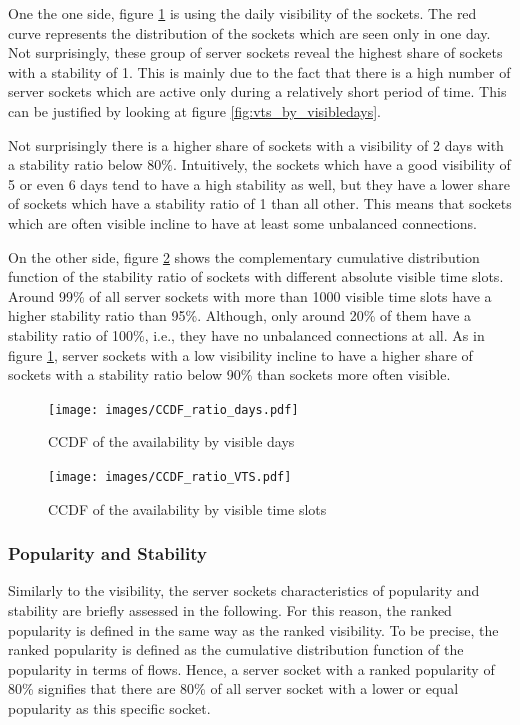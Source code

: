 One the one side, figure \ref{fig:ccdf_ratio_days} is using the daily visibility of the sockets. 
The red curve represents the distribution of the sockets which are seen only in one day. 
Not surprisingly, these group of \glspl{server socket} reveal the highest share of sockets with a stability of 1. 
This is mainly due to the fact that there is a high number of \glspl{server socket} which are active only during a relatively short period of time. This can be justified by looking at figure \ref{fig:vts_by_visibledays}.

Not surprisingly there is a higher share of sockets with a visibility of 2 days with a stability ratio below 80\%. 
Intuitively, the sockets which have a good visibility of 5 or even 6 days tend to have a high stability as well, but they have a lower share of sockets which have a stability ratio of 1 than all other. 
This means that sockets which are often visible incline to have at least some unbalanced connections.

On the other side, figure \ref{fig:ccdf_ratio_vts} shows the complementary cumulative distribution function of the stability ratio of sockets with different absolute visible time slots. 
Around 99\% of all \glspl{server socket} with more than 1000 visible time slots have a higher stability ratio than 95\%. 
Although, only around 20\% of them have a stability ratio of 100\%, i.e., they have no unbalanced connections at all. 
As in figure \ref{fig:ccdf_ratio_days}, \glspl{server socket} with a low visibility incline to have a higher share of sockets with a stability ratio below 90\% than sockets more often visible. 
\begin{landscape}
	\begin{figure}
		[p] \centering 
		\texttt{[image: images/CCDF\_ratio\_days.pdf]} \caption{CCDF of the availability by visible days} 
		\label{fig:ccdf_ratio_days} 
	\end{figure}
\end{landscape}
\begin{landscape}
	\begin{figure}
		[p] \centering 
		\texttt{[image: images/CCDF\_ratio\_VTS.pdf]} \caption{CCDF of the availability by visible time slots} 
		\label{fig:ccdf_ratio_vts} 
	\end{figure}
\end{landscape}

\subsubsection{Popularity and Stability} Similarly to the visibility, the \glspl{server socket} characteristics of popularity and stability are briefly assessed in the following. 
For this reason, the ranked popularity is defined in the same way as the ranked visibility. 
To be precise, the ranked popularity is defined as the cumulative distribution function of the popularity in terms of flows. 
Hence, a \gls{server socket} with a ranked popularity of 80\% signifies that there are 80\% of all \gls{server socket} with a lower or equal popularity as this specific socket.

